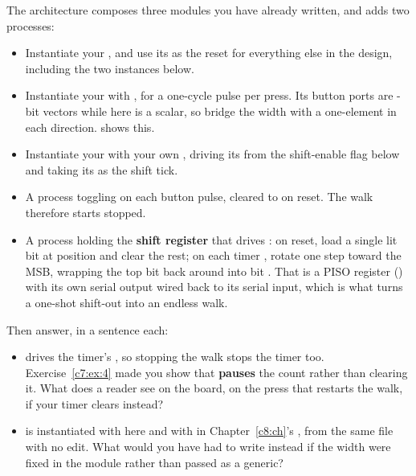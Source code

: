 \noindent The architecture composes three modules you have already written, and adds two
processes:
\begin{itemize}
  \item Instantiate your \textbf{}, and use its  as the reset for
    everything else in the design, including the two instances below.
  \item Instantiate your \textbf{} with , for a one-cycle
    pulse per press. Its button ports are -bit vectors while  here is a
    scalar, so bridge the width with a one-element  in each
    direction.  shows this.
  \item Instantiate your \textbf{} with your own , driving its
     from the shift-enable flag below and taking its  as the shift tick.
  \item A process toggling \textbf{} on each button pulse, cleared to 
    on reset. The walk therefore starts stopped.
  \item A process holding the \textbf{shift register} that drives : on reset, load a
    single lit bit at position  and clear the rest; on each timer , rotate one
    step toward the MSB, wrapping the top bit back around into bit . That is a PISO
    register () with its own serial output wired back to its serial input, which is
    what turns a one-shot shift-out into an endless walk.
\end{itemize}
Then answer, in a sentence each:
\begin{itemize}
  \item {} drives the timer's , so stopping the walk stops the timer
    too. Exercise~\ref{c7:ex:4} made you show that  \textbf{pauses} the count rather
    than clearing it. What does a reader see on the board, on the press that restarts the walk, if
    your timer clears instead?
  \item {} is instantiated with  here and with  in
    Chapter~\ref{c8:ch}'s , from the same file with no edit. What would you have had
    to write instead if the width were fixed in the module rather than passed as a generic?
\end{itemize}


